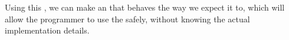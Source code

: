 Using this , we can make an  that behaves the way we expect it to, which will allow the programmer to use the  safely, without knowing the actual implementation details.








